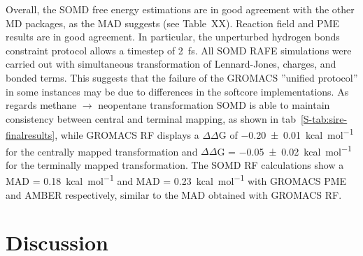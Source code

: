 \documentclass[journal=jctcce,manuscript=article]{achemso}
\begin{document}
Overall, the SOMD free energy estimations are in good agreement with the 
other MD packages, as the MAD suggests (see Table~XX).  Reaction field and PME 
results are in good agreement.  In particular, the unperturbed hydrogen bonds 
constraint protocol 
allows a timestep of \SI{2}{fs}. All SOMD RAFE simulations were carried out 
with simultaneous transformation of Lennard-Jones, charges, and bonded terms. 
This suggests that the failure of the GROMACS ''unified protocol'' in some 
instances may be due to differences in the softcore implementations. 
As regards methane $\rightarrow$ neopentane transformation SOMD is able to 
maintain consistency between central and terminal mapping, as shown in 
tab~\ref{S-tab:sire-finalresults}, while GROMACS RF displays a $\Delta\Delta$G 
of \SI{-0.20 +-   0.01}{kcal.mol^{-1}} for the centrally mapped transformation 
and $\Delta\Delta$G = \SI{-0.05 +- 0.02}{kcal.mol^{-1}} for the terminally 
mapped transformation. The SOMD RF calculations show a MAD = 
\SI{0.18}{kcal.mol^{-1}} and MAD = \SI{0.23}{kcal.mol^{-1}} with GROMACS PME 
and AMBER respectively, similar to the MAD obtained with GROMACS RF.

\section{Discussion}
\label{sec:discuss}




\end{document}
